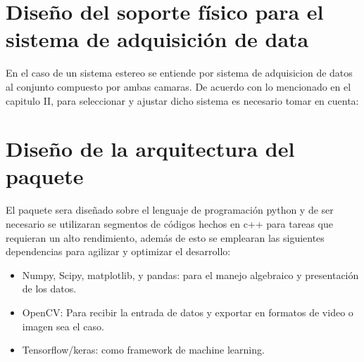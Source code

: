 \section{Diseño del soporte físico para el sistema de adquisición de data}
En el caso de un sistema estereo se entiende por sistema de adquisicion de datos al conjunto compuesto por ambas camaras. De acuerdo con lo mencionado en el capitulo II, para seleccionar y ajustar dicho sistema es necesario tomar en cuenta: 
\section{Diseño de la arquitectura del paquete}
El paquete sera diseñado sobre el lenguaje de programación python y de ser necesario se utilizaran segmentos de códigos hechos en c++ para tareas que requieran un alto rendimiento, además de esto se emplearan las siguientes dependencias para agilizar y optimizar el desarrollo:
\begin{itemize}
    \item Numpy, Scipy, matplotlib, y pandas: para el manejo algebraico y presentación de los datos.
    \item OpenCV: Para recibir la entrada de datos y exportar en formatos de video o imagen sea el caso.
    \item Tensorflow/keras: como framework de machine learning.
\end{itemize}
